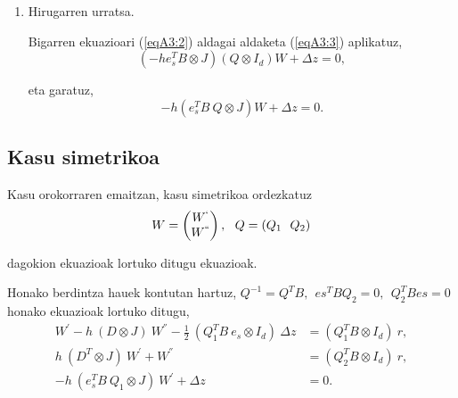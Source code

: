 \begin{enumerate}
\item Hirugarren urratsa.

Bigarren ekuazioari (\ref{eqA3:2}) aldagai aldaketa (\ref{eqA3:3}) aplikatuz,
\begin{equation*}
(- h e_s^T B \otimes J) (Q \otimes I_d) W + \Delta z =0, 
\end{equation*}

eta garatuz,
\begin{equation*}
- h (e_s^T 
B \ Q \otimes J) W +\Delta z =0.
\end{equation*}

\end{enumerate}

\subsection*{Kasu simetrikoa}
\label{serans:A32}

Kasu orokorraren emaitzan, kasu simetrikoa ordezkatuz 
\begin{align*}
W=\left(
\begin{matrix}
W^{`} \\
W^{``} 
\end{matrix}
\right), \ \ Q=(Q_1 \ \ Q_2)
\end{align*}

dagokion ekuazioak lortuko ditugu ekuazioak.

Honako berdintza hauek kontutan hartuz, $Q^{-1}=Q^TB, \ \ es^TBQ_2=0, \ \ Q_2^TBes=0$ honako ekuazioak lortuko ditugu,
\begin{align*}
 W^{'}-h \ (D \otimes J) \ W^{''} -\frac{1}{2}\ (Q_1^T B \ e_s \otimes I_d) \ \Delta z &= (Q_1^T B \otimes I_d) \ r,\\
 h \ (D^T \otimes J) \ W^{'}+W^{''} &= (Q_2^T B \otimes I_d) \ r, \\
  - h \ (e_s^T B \ Q_1 \otimes J) \ W^{'} + \Delta z &=0. 
\end{align*}





